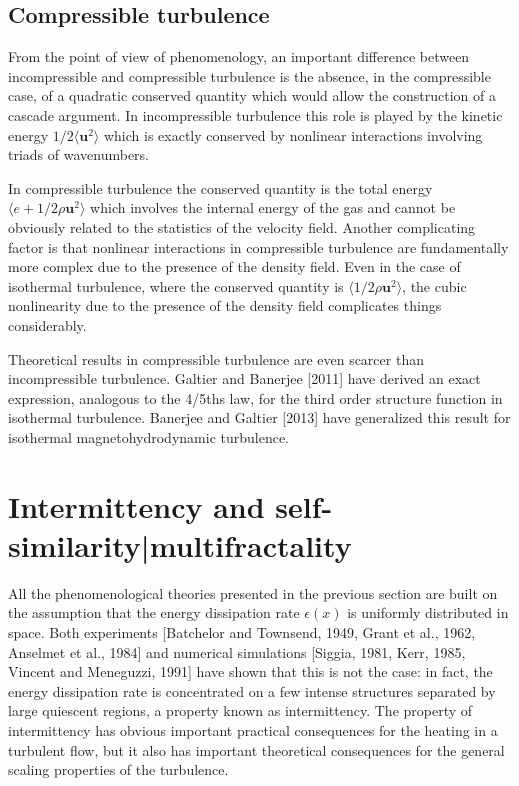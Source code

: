 \subsection{Compressible turbulence}

From the point of view of phenomenology, an important difference between incompressible and compressible turbulence is the absence, in the compressible case, of a quadratic conserved quantity which would allow the construction of a cascade argument. In incompressible turbulence this role is played by the kinetic energy $1/2\langle\mathbf{u}^2\rangle$ which is exactly conserved by nonlinear interactions involving triads of wavenumbers. 

In compressible turbulence the conserved quantity is the total energy $\langle e+1/2\rho\mathbf{u}^2\rangle$ which involves the internal
energy of the gas and cannot be obviously related to the statistics of the velocity field. Another complicating factor is that nonlinear interactions in compressible turbulence are fundamentally more complex due to the presence of the density field. Even in the case of isothermal turbulence, where the conserved quantity is $\langle1/2\rho\mathbf{u}^2\rangle$, the cubic nonlinearity due to the presence of the density field complicates things considerably.

Theoretical results in compressible turbulence are even scarcer than incompressible turbulence. Galtier and Banerjee [2011] have derived an exact expression, analogous to the 4/5ths law, for the third order structure function in isothermal turbulence. Banerjee and Galtier [2013] have generalized this result for isothermal magnetohydrodynamic turbulence.

\section{Intermittency and self-similarity|multifractality}
All the phenomenological theories presented in the previous section are built on the assumption that the energy dissipation rate $\epsilon(x)$ is uniformly distributed in space. Both experiments [Batchelor and Townsend, 1949, Grant et al., 1962, Anselmet et al., 1984] and numerical simulations [Siggia, 1981, Kerr, 1985, Vincent and Meneguzzi, 1991] have shown that this is not the case: in fact, the energy dissipation rate is concentrated on a few intense structures separated by large quiescent regions, a property known as intermittency.
The property of intermittency has obvious important practical consequences for the heating in a turbulent flow, but it also has important theoretical consequences for the general scaling properties of the turbulence.

